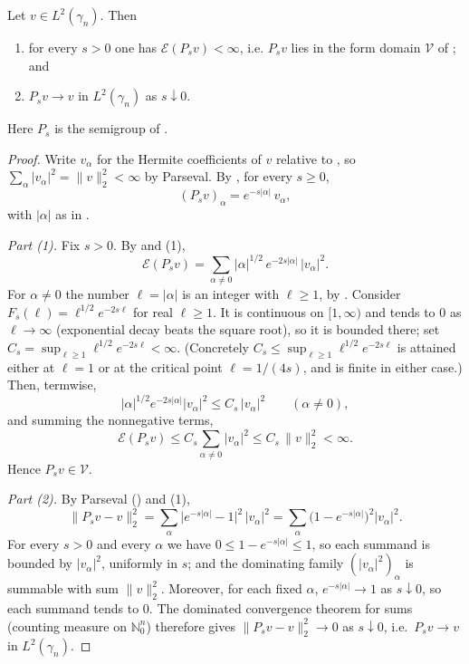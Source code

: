 \begin{lemma}
Let $v \in L^2(\gamma_n)$.  Then
\begin{enumerate}
\item for every $s > 0$ one has $\mathcal{E}(P_s v) < \infty$, i.e.
$P_s v$ lies in the form domain $\mathcal{V}$ of ; and
\item $P_s v \to v$ in $L^2(\gamma_n)$ as $s \downarrow 0$.
\end{enumerate}
Here $P_s$ is the semigroup of .
\end{lemma}
\begin{proof}
Write $v_\alpha$ for the Hermite coefficients of $v$ relative to
, so $\sum_\alpha |v_\alpha|^2 = \|v\|_2^2 < \infty$ by
Parseval.  By , for every $s \geq 0$,
\begin{equation*}
  (P_s v)_\alpha = e^{-s|\alpha|}\, v_\alpha , \tag{1}
\end{equation*}
with $|\alpha|$ as in .

\emph{Part (1).}
Fix $s > 0$.  By  and (1),
\[
  \mathcal{E}(P_s v)
    = \sum_{\alpha \neq 0} |\alpha|^{1/2}\, e^{-2s|\alpha|}\, |v_\alpha|^2 .
\]
For $\alpha \neq 0$ the number $\ell = |\alpha|$ is an integer with
$\ell \geq 1$, by .  Consider
$F_s(\ell) = \ell^{1/2}e^{-2s\ell}$ for real $\ell \geq 1$.  It is continuous on
$[1,\infty)$ and tends to $0$ as $\ell \to \infty$ (exponential decay beats the
square root), so it is bounded there; set
$C_s = \sup_{\ell \geq 1} \ell^{1/2}e^{-2s\ell} < \infty$.  (Concretely
$C_s \leq \sup_{\ell\geq1}\ell^{1/2}e^{-2s\ell}$ is attained either at
$\ell = 1$ or at the critical point $\ell = 1/(4s)$, and is finite in either
case.)  Then, termwise,
\[
  |\alpha|^{1/2}e^{-2s|\alpha|}|v_\alpha|^2 \leq C_s\, |v_\alpha|^2
  \qquad (\alpha \neq 0),
\]
and summing the nonnegative terms,
\[
  \mathcal{E}(P_s v) \leq C_s \sum_{\alpha \neq 0}|v_\alpha|^2
    \leq C_s\, \|v\|_2^2 < \infty .
\]
Hence $P_s v \in \mathcal{V}$.

\emph{Part (2).}
By Parseval () and (1),
\[
  \|P_s v - v\|_2^2
    = \sum_{\alpha} \bigl|e^{-s|\alpha|} - 1\bigr|^2\, |v_\alpha|^2
    = \sum_{\alpha} \bigl(1 - e^{-s|\alpha|}\bigr)^2 |v_\alpha|^2 .
\]
For every $s > 0$ and every $\alpha$ we have
$0 \leq 1 - e^{-s|\alpha|} \leq 1$, so each summand is bounded by
$|v_\alpha|^2$, uniformly in $s$; and the dominating family
$(|v_\alpha|^2)_\alpha$ is summable with sum $\|v\|_2^2$.  Moreover, for each
fixed $\alpha$, $e^{-s|\alpha|} \to 1$ as $s \downarrow 0$, so each summand tends
to $0$.  The dominated convergence theorem for sums (counting measure on
$\mathbb{N}_0^n$) therefore gives $\|P_sv - v\|_2^2 \to 0$ as $s \downarrow 0$,
i.e.\ $P_s v \to v$ in $L^2(\gamma_n)$.
\end{proof}
